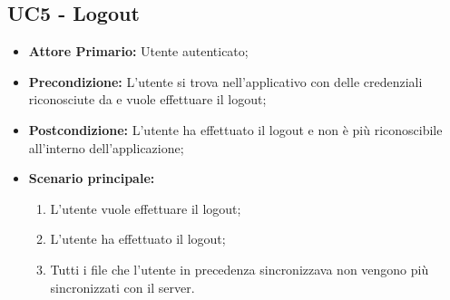 \subsection{UC5 - Logout}
\label{UC5}
\begin{itemize}
\item \textbf{Attore Primario:} Utente autenticato;
\item \textbf{Precondizione:} L'utente si trova nell'applicativo con delle credenziali riconosciute da  e vuole effettuare il logout;
\item \textbf{Postcondizione:} L'utente ha effettuato il logout e non è più riconoscibile all'interno dell'applicazione;
\item \textbf{Scenario principale:}
    \begin{enumerate}
    \item L'utente vuole effettuare il logout;
    \item L'utente ha effettuato il logout;
    \item Tutti i file che l'utente in precedenza sincronizzava non vengono più sincronizzati con il server.
    \end{enumerate}
\end{itemize}